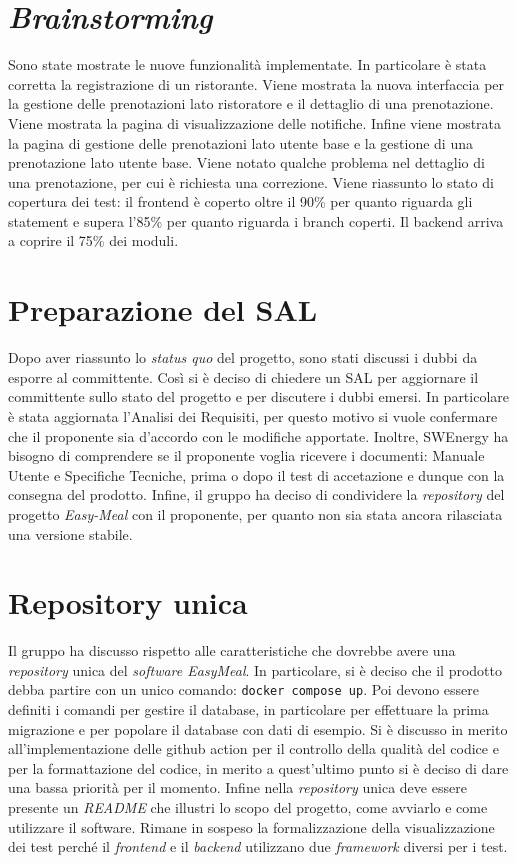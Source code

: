 \section{\textit{Brainstorming}}

Sono state mostrate le nuove funzionalità implementate. In particolare è stata
corretta la registrazione di un ristorante. Viene mostrata la nuova interfaccia
per la gestione delle prenotazioni lato ristoratore e il dettaglio di una
prenotazione. Viene mostrata la pagina di visualizzazione delle notifiche.
Infine viene mostrata la pagina di gestione delle prenotazioni lato utente base
e la gestione di una prenotazione lato utente base. Viene notato qualche
problema nel dettaglio di una prenotazione, per cui è richiesta una correzione.
Viene riassunto lo stato di copertura dei test: il frontend è coperto oltre il
90\% per quanto riguarda gli statement e supera l'85\% per quanto riguarda i
branch coperti. Il backend arriva a coprire il 75\% dei moduli.


\section{Preparazione del SAL}

Dopo aver riassunto lo \textit{status quo} del progetto, sono stati discussi i
dubbi da esporre al committente. Così si è deciso di chiedere un SAL per
aggiornare il committente sullo stato del progetto e per discutere i dubbi
emersi. In particolare è stata aggiornata l'Analisi dei Requisiti, per questo
motivo si vuole confermare che il proponente sia d'accordo con le modifiche
apportate. Inoltre, SWEnergy ha bisogno di comprendere se il proponente voglia
ricevere i documenti: Manuale Utente e Specifiche Tecniche, prima o dopo il test
di accetazione e dunque con la consegna del prodotto. Infine, il gruppo ha
deciso di condividere la \textit{repository} del progetto \textit{Easy-Meal} con
il proponente, per quanto non sia stata ancora rilasciata una versione stabile.

\section{Repository unica}

Il gruppo ha discusso rispetto alle caratteristiche che dovrebbe avere una
\textit{repository} unica del \textit{software EasyMeal}. In particolare, si è 
deciso che il prodotto debba partire con un unico comando: 
\texttt{docker compose up}. Poi devono essere definiti i comandi per gestire il
database, in particolare per effettuare la prima migrazione e per popolare il
database con dati di esempio. Si è discusso in merito all'implementazione delle
github action per il controllo della qualità del codice e per la formattazione
del codice, in merito a quest'ultimo punto si è deciso di dare una bassa
priorità per il momento. Infine nella \textit{repository} unica deve essere
presente un \textit{README} che illustri lo scopo del progetto, come avviarlo e
come utilizzare il software. Rimane in sospeso la formalizzazione della
visualizzazione dei test perché il \textit{frontend} e il \textit{backend} 
utilizzano due \textit{framework} diversi per i test.
